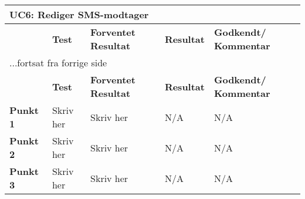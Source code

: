 
\begin{center}
\begin{longtable}{|p{}|p{}|p{3cm}|p{3cm}|p{3cm}|} %
\hline
\multicolumn{5}{|l|}{\textbf{UC6: Rediger SMS-modtager}} \\ \hline
\multicolumn{1}{|c|}{} &
\textbf{Test} &
\textbf{Forventet \newline Resultat} &
\textbf{Resultat} &
\textbf{Godkendt/ \newline Kommentar} \\ \hline 
\endfirsthead

\multicolumn{5}{l}{...fortsat fra forrige side} \\ \hline 
\multicolumn{1}{|c|}{} &
\textbf{Test} &
\textbf{Forventet \newline Resultat} &
\textbf{Resultat} &
\textbf{Godkendt/ \newline Kommentar} \\ \hline 
\endhead


\textbf{Punkt 1} &
Skriv her &
Skriv her &
N/A &
N/A \\\hline

\textbf{Punkt 2} &
Skriv her &
Skriv her &
N/A &
N/A \\\hline

\textbf{Punkt 3} &
Skriv her &
Skriv her &
N/A &
N/A \\\hline

	\end{longtable}
	\label{ATUC6} 
\end{center}